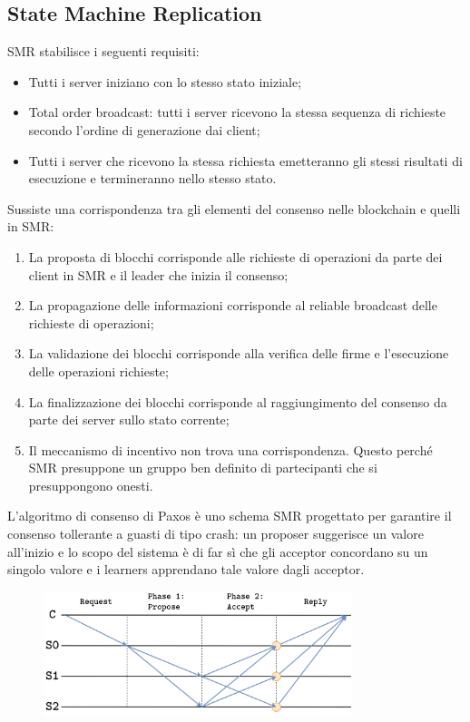 \subsection{State Machine Replication}
SMR stabilisce i seguenti requisiti:
\begin{itemize}
    \item Tutti i server iniziano con lo stesso stato iniziale;
    \item Total order broadcast: tutti i server ricevono la stessa sequenza di richieste secondo l'ordine di generazione dai client;
    \item Tutti i server che ricevono la stessa richiesta emetteranno gli stessi risultati di esecuzione e termineranno nello stesso stato.
\end{itemize}
Sussiste una corrispondenza tra gli elementi del consenso nelle blockchain e quelli in SMR:
\begin{enumerate}
    \item La proposta di blocchi corrisponde alle richieste di operazioni da parte dei client in SMR e il leader che inizia il consenso;
    \item La propagazione delle informazioni corrisponde al reliable broadcast delle richieste di operazioni;
    \item La validazione dei blocchi corrisponde alla verifica delle firme e l'esecuzione delle operazioni richieste;
    \item La finalizzazione dei blocchi corrisponde al raggiungimento del consenso da parte dei server sullo stato corrente;
    \item Il meccanismo di incentivo non trova una corrispondenza. Questo perché SMR presuppone un gruppo ben definito di partecipanti che si presuppongono onesti.
\end{enumerate}
L'algoritmo di consenso di Paxos è uno schema SMR progettato per garantire il consenso tollerante a guasti di tipo crash: un proposer suggerisce un valore all'inizio e lo scopo del sistema è di far sì che gli acceptor concordano su un singolo valore e i learners apprendano tale valore dagli acceptor.

\begin{figure}[htb!]
    \centering
    \includegraphics[width=9cm]{./Images/cap3/3.8.png}
\end{figure}

